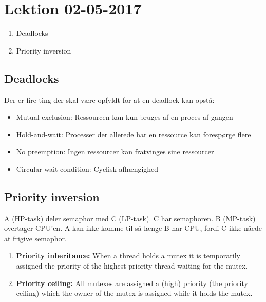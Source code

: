 \section{Lektion 02-05-2017}

\begin{enumerate}
	\item Deadlocks
	\item Priority inversion
\end{enumerate}

\subsection{Deadlocks}
Der er fire ting der skal være opfyldt for at en deadlock kan opstå:
\begin{itemize}
	\item Mutual exclusion: Ressourcen kan kun bruges af en proces af gangen
	\item Hold-and-wait: Processer der allerede har en ressource kan forespørge flere
	\item No preemption: Ingen ressourcer kan fratvinges sine ressourcer
	\item Circular wait condition: Cyclisk afhængighed
\end{itemize}

\subsection{Priority inversion}
A (HP-task) deler semaphor med C (LP-task). C har semaphoren.  B (MP-task) overtager CPU'en. A kan ikke komme til så længe B har CPU, fordi C ikke nåede at frigive semaphor.

\begin{enumerate}
	\item \textbf{Priority inheritance:} When a thread holds a mutex it is temporarily assigned the priority of the highest-priority thread waiting for the mutex.
	\item \textbf{Priority ceiling:} All mutexes are assigned a (high) priority (the priority ceiling) which the owner of the mutex is assigned while it holds the mutex.
\end{enumerate}